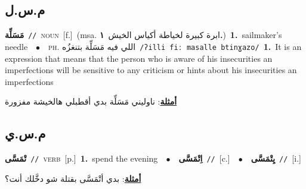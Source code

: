 \documentclass[10pt,a4paper,twoside]{article} %
\begin{document}
\begin{multicols}{2}
\vspace{-3mm}
\subsection*{\color{blue}\foreignlanguage{arabic}{م.س.ل}\color{blue}{}} 

{\setlength\topsep{0pt}\textbf{\foreignlanguage{arabic}{مَسَلِّة}}\ {\color{gray}\texttt{//}\color{black}}\ \textsc{noun}\ [f.]\ \color{gray}(msa. \foreignlanguage{arabic}{ابرة كبيرة لخياطة أكياس الخيش}~\foreignlanguage{arabic}{\textbf{١.}})\color{black}\ \textbf{1.}~sailmaker's needle\ \ $\bullet$\ \ \textsc{ph.} \color{gray} \foreignlanguage{arabic}{اللي فيه مَسَلِّة بتنغزُه}\color{black}\ {\color{gray}\texttt{/{\sffamily ʔilli fiː masalle btinɣazo}/}\color{black}}\ \textbf{1.}~It is an expression that means that the person who is aware of his insecurities an imperfections will be sensitive to any criticism or hints about his insecurities an imperfections\  \begin{flushright}\color{gray}\foreignlanguage{arabic}{\textbf{\underline{\foreignlanguage{arabic}{أمثلة}}}: ناوليني مَسَلِّة بدي أقطبلي هالخيشة مفزورة}\end{flushright}\color{black}} \vspace{2mm}

\vspace{-3mm}
\subsection*{\color{blue}\foreignlanguage{arabic}{م.س.ي}\color{blue}{}} 

{\setlength\topsep{0pt}\textbf{\foreignlanguage{arabic}{تْمَسَّى}}\ {\color{gray}\texttt{//}\color{black}}\ \textsc{verb}\ [p.]\ \textbf{1.}~spend the evening\ \ $\bullet$\ \ \setlength\topsep{0pt}\textbf{\foreignlanguage{arabic}{اِتْمَسَّى}}\ {\color{gray}\texttt{//}\color{black}}\ [c.]\ \ $\bullet$\ \ \setlength\topsep{0pt}\textbf{\foreignlanguage{arabic}{يِتْمَسَّى}}\ {\color{gray}\texttt{//}\color{black}}\ [i.]\  \begin{flushright}\color{gray}\foreignlanguage{arabic}{\textbf{\underline{\foreignlanguage{arabic}{أمثلة}}}: بدي أتْمَسَّى بقتلة شو دخَّلك أنت؟}\end{flushright}\color{black}} \vspace{2mm}


\end{multicols}
\end{document}
